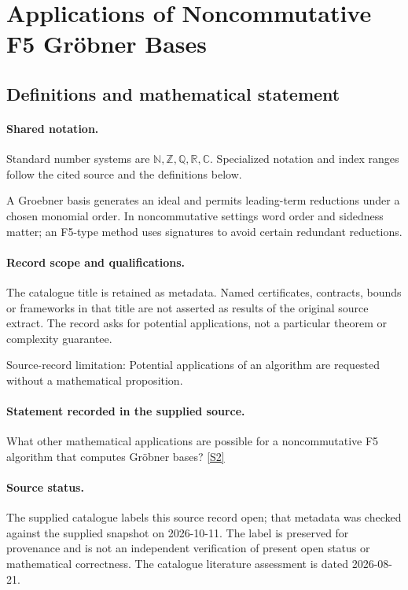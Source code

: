 \documentclass[11pt]{article}
\newcommand{\sref}[2]{\hyperlink{source:#1:#2}{[S#2]}}
\begin{document}
\section{Applications of Noncommutative F5 Gröbner Bases}\label{statement}

\subsection{Definitions and mathematical statement}

\paragraph{Shared notation.}Standard number systems are $\mathbb N,\mathbb Z,\mathbb Q,\mathbb R,\mathbb C$. Specialized notation and index ranges follow the cited source and the definitions below.


A Groebner basis generates an ideal and permits leading-term reductions under a chosen monomial order. In noncommutative settings word order and sidedness matter; an F5-type method uses signatures to avoid certain redundant reductions.
\paragraph{Record scope and qualifications.}
The catalogue title is retained as metadata. Named certificates, contracts, bounds or frameworks in that title are not asserted as results of the original source extract.
The record asks for potential applications, not a particular theorem or complexity guarantee.

Source-record limitation: Potential applications of an algorithm are requested without a mathematical proposition.
\paragraph{Statement recorded in the supplied source.}
What other mathematical applications are possible for a noncommutative F5 algorithm that computes Gröbner bases? \sref{statement}{2}
\paragraph{Source status.}
The supplied catalogue labels this source record open; that metadata was checked against the supplied snapshot on 2026-10-11. The label is preserved for provenance and is not an independent verification of present open status or mathematical correctness. The catalogue literature assessment is dated 2026-08-21.
\end{document}
